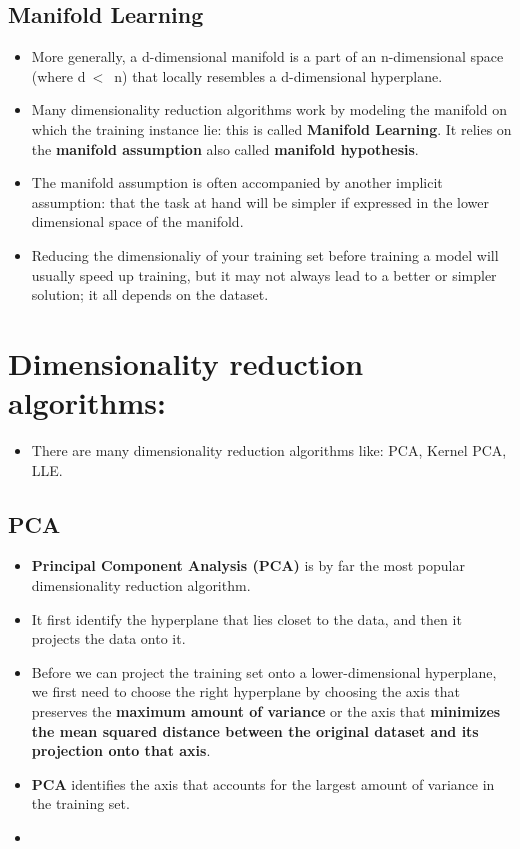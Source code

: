 \documentclass{article}
\begin{document}
	\subsection{Manifold Learning}
	\begin{itemize}
		\item More generally, a d-dimensional manifold is a part of an n-dimensional space (where d$\ < $\ n) that locally resembles a d-dimensional hyperplane.
		\item Many dimensionality reduction algorithms work by modeling the manifold on which the training instance lie: this is called \textbf{Manifold Learning}. It relies on the \textbf{manifold assumption} also called \textbf{manifold hypothesis}.
		\item The manifold assumption is often accompanied by another implicit assumption: that the task at hand will be simpler if expressed in the lower dimensional space of the manifold.
		\item Reducing the dimensionaliy of your training set before training a model will usually speed up training, but it may not always lead to a better or simpler solution; it all depends on the dataset.
	\end{itemize}
	\section{Dimensionality reduction algorithms:}	
	\begin{itemize}
		\item There are many dimensionality reduction algorithms like: PCA, Kernel PCA, LLE.
	\end{itemize}
	\subsection{PCA}
	\begin{itemize}
		\item \textbf{Principal Component Analysis (PCA)} is by far the most popular dimensionality reduction algorithm.
		\item It first identify the hyperplane that lies closet to the data, and then it projects the data onto it.
		\item Before we can project the training set onto a lower-dimensional hyperplane, we first need to choose the right hyperplane by choosing the axis that preserves the \textbf{maximum amount of variance} or the axis that \textbf{minimizes the mean squared distance between the original dataset and its projection onto that axis}.
		\item \textbf{PCA} identifies the axis that accounts for the largest amount of variance in the training set.
		\item 
	\end{itemize}
\end{document}
